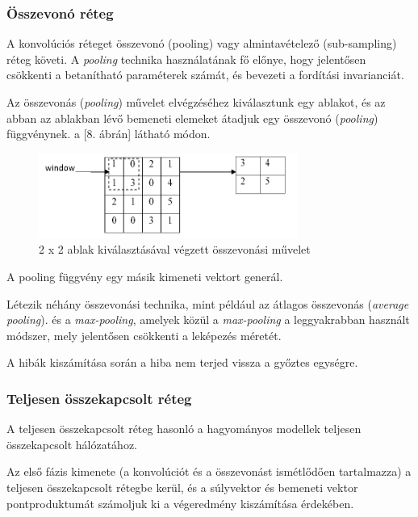 \documentclass[12pt,a4]{article}
\begin{document}
	\subsubsection{Összevonó réteg}

	A konvolúciós réteget összevonó (pooling) vagy 
	almintavételező (sub-sampling) \cite{CNN} réteg követi.
	A \textit{pooling} technika használatának fő előnye, hogy 
	jelentősen csökkenti a betanítható paraméterek számát,
	és bevezeti a fordítási invarianciát. 
	
	
	Az összevonás (\textit{pooling}) művelet elvégzéséhez kiválasztunk egy ablakot,
	és az abban az ablakban lévő bemeneti elemeket átadjuk
	egy összevonó (\textit{pooling}) függvénynek. a [8. ábrán] látható módon.
	
	\begin{figure}[h]	
		\centering
		\includegraphics[width=0.7\linewidth]{pooling}
		\caption{\cite{CNN} 2 x 2 ablak kiválasztásával végzett összevonási művelet}
	\end{figure}
	
	\newpage
	
	A pooling függvény egy másik kimeneti vektort generál.
	
	
	Létezik néhány összevonási technika, mint például az átlagos összevonás (\textit{average pooling}). 
	és a \textit{max-pooling}, amelyek közül a \textit{max-pooling} a leggyakrabban használt módszer,
	mely jelentősen csökkenti a leképezés méretét.
	
	
	A hibák kiszámítása során a hiba nem terjed vissza a győztes egységre.
	
	\subsubsection{Teljesen összekapcsolt réteg}
	
	A teljesen összekapcsolt réteg \cite{CNN} hasonló a hagyományos modellek teljesen összekapcsolt hálózatához.
	
	
	Az első
	fázis kimenete (a konvolúciót és a összevonást ismétlődően tartalmazza) a teljesen összekapcsolt rétegbe kerül, és a súlyvektor és bemeneti vektor pontproduktumát számoljuk ki a végeredmény kiszámítása érdekében.
	
\end{document}
